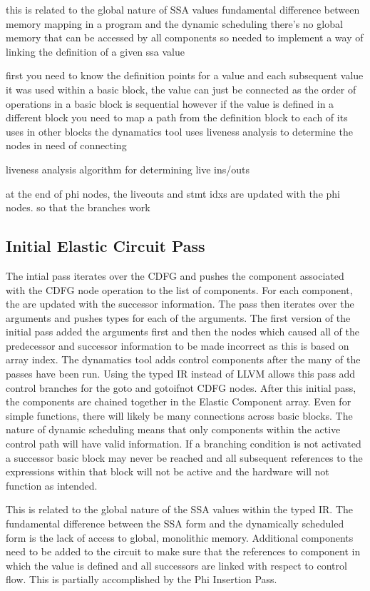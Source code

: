 this is related to the global nature of SSA values
		fundamental difference between memory mapping in a program and the dynamic scheduling
		there's no global memory that can be accessed by all components
		so needed to implement a way of linking the definition of a given ssa value
		
		first you need to know the definition points for a value and each subsequent value it was used
		within a basic block, the value can just be connected as the order of operations in a basic block is sequential
		however if the value is defined in a different block you need to map a path from the definition block to each of its uses in other blocks
	the dynamatics tool uses liveness analysis to determine the nodes in need of connecting
	
liveness analysis 
	algorithm for determining live ins/outs
	
at the end of phi nodes, the liveouts and stmt idxs are updated with the phi nodes. so that the branches work
\fi
\subsection{Initial Elastic Circuit Pass}
The intial pass iterates over the CDFG and pushes the component associated with the CDFG node operation to the list of components. For each component, the  are updated with the successor information. The pass then iterates over the arguments and pushes  types for each of the arguments. The first version of the initial pass added the arguments first and then the nodes which caused all of the predecessor and successor information to be made incorrect as this is based on array index. The dynamatics tool adds control components after the many of the passes have been run. Using the typed IR instead of LLVM allows this pass add control branches for the goto and gotoifnot CDFG nodes. After this initial pass, the components are chained together in the Elastic Component array. Even for simple functions, there will likely be many connections across basic blocks. The nature of dynamic scheduling means that only components within the active control path will have valid information. If a branching condition is not activated a successor basic block may never be reached and all subsequent references to the expressions within that block will not be active and the hardware will not function as intended.

This is related to the global nature of the SSA values within the typed IR. The fundamental difference between the SSA form and the dynamically scheduled form is the lack of access to global, monolithic memory. Additional components need to be added to the circuit to make sure that the references to component in which the value is defined and all successors are linked with respect to control flow. This is partially accomplished by the Phi Insertion Pass.

